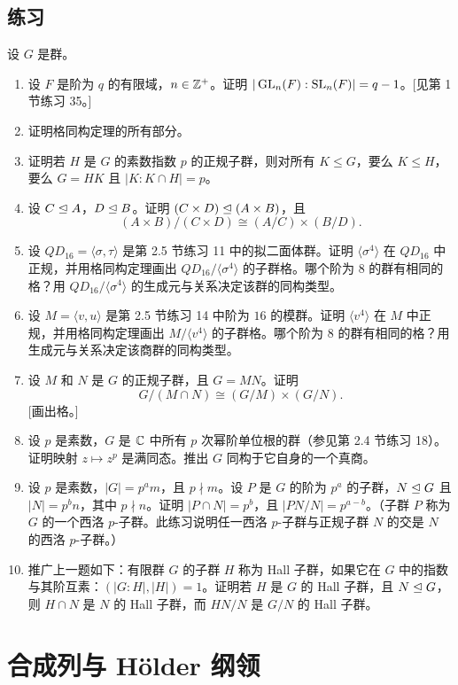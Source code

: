 \subsection*{练习}
设 $G$ 是群。
\begin{enumerate}[label=\arabic*.]
  \item 设 $F$ 是阶为 $q$ 的有限域，$n\in\mathbb{Z}^+$。证明 $|\operatorname{GL}_n(F):\operatorname{SL}_n(F)|=q-1$。[见第 1 节练习 35。]
  \item 证明格同构定理的所有部分。
  \item 证明若 $H$ 是 $G$ 的素数指数 $p$ 的正规子群，则对所有 $K\leq G$，要么 $K\leq H$，要么 $G=HK$ 且 $|K:K\cap H|=p$。
  \item 设 $C\trianglelefteq A$，$D\trianglelefteq B$。证明 $(C\times D)\trianglelefteq(A\times B)$，且
  \[
    (A\times B)/(C\times D)\cong (A/C)\times(B/D).
  \]
  \item 设 $QD_{16}=\langle\sigma,\tau\rangle$ 是第 2.5 节练习 11 中的拟二面体群。证明 $\langle\sigma^4\rangle$ 在 $QD_{16}$ 中正规，并用格同构定理画出 $QD_{16}/\langle\sigma^4\rangle$ 的子群格。哪个阶为 $8$ 的群有相同的格？用 $QD_{16}/\langle\sigma^4\rangle$ 的生成元与关系决定该群的同构类型。
  \item 设 $M=\langle v,u\rangle$ 是第 2.5 节练习 14 中阶为 $16$ 的模群。证明 $\langle v^4\rangle$ 在 $M$ 中正规，并用格同构定理画出 $M/\langle v^4\rangle$ 的子群格。哪个阶为 $8$ 的群有相同的格？用生成元与关系决定该商群的同构类型。
  \item 设 $M$ 和 $N$ 是 $G$ 的正规子群，且 $G=MN$。证明
  \[
    G/(M\cap N)\cong (G/M)\times(G/N).
  \]
  [画出格。]
  \item 设 $p$ 是素数，$G$ 是 $\mathbb{C}$ 中所有 $p$ 次幂阶单位根的群（参见第 2.4 节练习 18）。证明映射 $z\mapsto z^p$ 是满同态。推出 $G$ 同构于它自身的一个真商。
  \item 设 $p$ 是素数，$|G|=p^am$，且 $p\nmid m$。设 $P$ 是 $G$ 的阶为 $p^a$ 的子群，$N\trianglelefteq G$ 且 $|N|=p^bn$，其中 $p\nmid n$。证明 $|P\cap N|=p^b$，且 $|PN/N|=p^{a-b}$。（子群 $P$ 称为 $G$ 的一个西洛 $p$-子群。此练习说明任一西洛 $p$-子群与正规子群 $N$ 的交是 $N$ 的西洛 $p$-子群。）
  \item 推广上一题如下：有限群 $G$ 的子群 $H$ 称为 Hall 子群，如果它在 $G$ 中的指数与其阶互素：$(|G:H|,|H|)=1$。证明若 $H$ 是 $G$ 的 Hall 子群，且 $N\trianglelefteq G$，则 $H\cap N$ 是 $N$ 的 Hall 子群，而 $HN/N$ 是 $G/N$ 的 Hall 子群。
\end{enumerate}

\section{合成列与 Hölder 纲领}


